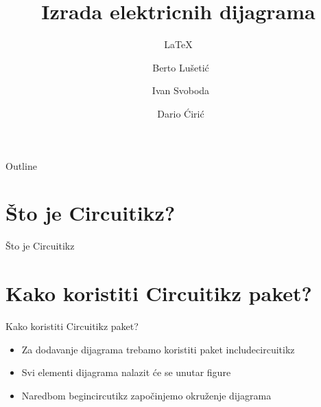 \documentclass{beamer}
\title{Izrada elektricnih dijagrama}
\subtitle{LaTeX}
\author{~Berto Lušetić \and ~Ivan Svoboda \and ~Dario Ćirić}
\institute[Sveučilište u Rijeci TEHNIČKI FAKULTET]
\begin{document}
\begin{frame}
  \titlepage
\end{frame}

\begin{frame}{Outline}
  \tableofcontents
\end{frame}

\section{Što je Circuitikz?}

\begin{frame}{Što je Circuitikz}
\end{frame}

\section{Kako koristiti Circuitikz paket?}


\begin{frame}{Kako koristiti Circuitikz paket?}
  \begin{itemize}
  \item {
    Za dodavanje dijagrama trebamo koristiti paket 
    include{circuitikz}
  }
  \item{
    Svi elementi dijagrama nalazit će se unutar figure
  }
  \item{
  Naredbom begin{circutikz} započinjemo okruženje dijagrama
  }
  \end{itemize}
\end{frame}

\end{document}
